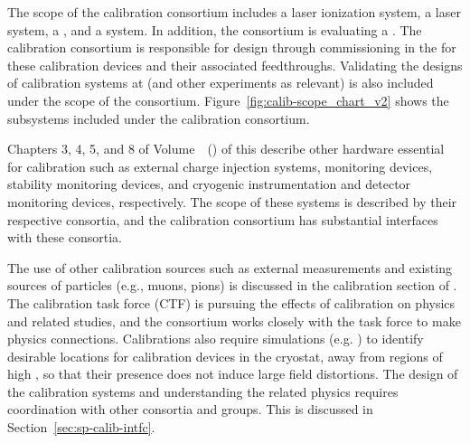 
The scope of the calibration consortium includes a laser ionization system, a \phel laser system, a 
, 
and a  system. In addition, the consortium is evaluating a .
The calibration consortium is responsible for design through commissioning in the  for these calibration devices and their associated feedthroughs. Validating the designs of calibration systems at  (and other experiments as relevant) is also included under the scope of the consortium. Figure~\ref{fig:calib-scope_chart_v2} shows the subsystems included under the calibration consortium. 


Chapters 3, 4, 5, and 8 of Volume~\volnumbersp~(\voltitlesp) of this  describe other hardware essential for calibration such as  external charge injection systems,  monitoring devices,  stability monitoring devices, and cryogenic instrumentation and detector monitoring devices, respectively. The scope of these systems is described by their respective consortia, and the calibration consortium has substantial interfaces with these consortia. 

The use of other calibration sources such as external measurements and existing sources of particles (e.g., muons, pions) is discussed in the calibration section of  \physchtools. 
The calibration task force (CTF) is pursuing the effects of calibration on physics and related studies, and the consortium works closely with the task force to make physics connections. Calibrations also require simulations (e.g. \efield) to identify desirable locations for calibration devices in the cryostat, away from regions of high \efield, so that their presence does not induce large field distortions. 
The design of the calibration systems and understanding the related physics requires coordination with other consortia and groups. This is discussed in Section~\ref{sec:sp-calib-intfc}.

